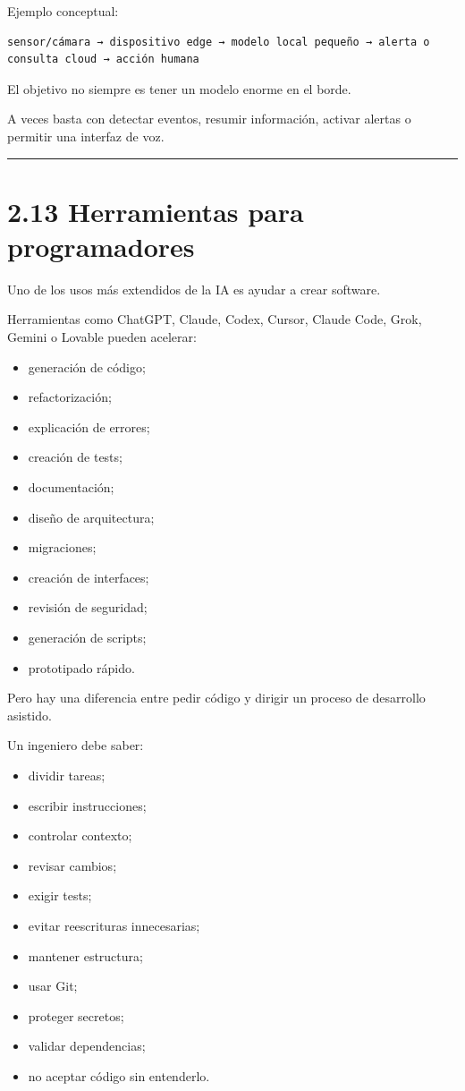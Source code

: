 Ejemplo conceptual:

\begin{lstlisting}
sensor/cámara → dispositivo edge → modelo local pequeño → alerta o consulta cloud → acción humana
\end{lstlisting}

El objetivo no siempre es tener un modelo enorme en el borde.

A veces basta con detectar eventos, resumir información, activar alertas
o permitir una interfaz de voz.

\begin{center}\rule{0.5\linewidth}{0.5pt}\end{center}

\section{2.13 Herramientas para
programadores}\label{herramientas-para-programadores}

Uno de los usos más extendidos de la IA es ayudar a crear software.

Herramientas como ChatGPT, Claude, Codex, Cursor, Claude Code, Grok,
Gemini o Lovable pueden acelerar:

\begin{itemize}
\tightlist
\item
  generación de código;
\item
  refactorización;
\item
  explicación de errores;
\item
  creación de tests;
\item
  documentación;
\item
  diseño de arquitectura;
\item
  migraciones;
\item
  creación de interfaces;
\item
  revisión de seguridad;
\item
  generación de scripts;
\item
  prototipado rápido.
\end{itemize}

Pero hay una diferencia entre pedir código y dirigir un proceso de
desarrollo asistido.

Un ingeniero debe saber:

\begin{itemize}
\tightlist
\item
  dividir tareas;
\item
  escribir instrucciones;
\item
  controlar contexto;
\item
  revisar cambios;
\item
  exigir tests;
\item
  evitar reescrituras innecesarias;
\item
  mantener estructura;
\item
  usar Git;
\item
  proteger secretos;
\item
  validar dependencias;
\item
  no aceptar código sin entenderlo.
\end{itemize}

